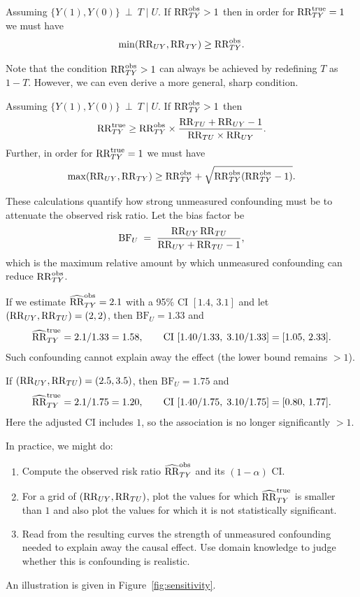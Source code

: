 \documentclass[11pt]{exam}
\begin{document}
\begin{theorem}
    Assuming $\{Y(1),Y(0)\}\ \perp\ T \mid U$. If $\mathrm{RR}^{\mathrm{obs}}_{TY} > 1$ then in order for $\mathrm{RR}^{\mathrm{true}}_{TY} = 1$ we must have 
    \[
        \min(\mathrm{RR}_{UY}, \mathrm{RR}_{TY})  \geq \mathrm{RR}^{\mathrm{obs}}_{TY}.
    \] 
\end{theorem}
Note that the condition $\mathrm{RR}^{\mathrm{obs}}_{TY} > 1$ can always be achieved by redefining $T$ as $1 - T$. However, we can even derive a more general, sharp condition.
\begin{theorem}\label{thm:risk_sensitivity}
    Assuming $\{Y(1),Y(0)\}\ \perp\ T \mid U$. If $\mathrm{RR}^{\mathrm{obs}}_{TY} > 1$ then
    \[
        \mathrm{RR}^{\mathrm{true}}_{TY} \geq \mathrm{RR}^{\mathrm{obs}}_{TY} \times \frac{\mathrm{RR}_{TU} + \mathrm{RR}_{UY} - 1}{\mathrm{RR}_{TU} \times \mathrm{RR}_{UY}}.
    \]
    Further, in order for $\mathrm{RR}^{\mathrm{true}}_{TY} = 1$ we must have
    \[
        \max(\mathrm{RR}_{UY}, \mathrm{RR}_{TY})  \geq \mathrm{RR}^{\mathrm{obs}}_{TY} + \sqrt{\mathrm{RR}^{\mathrm{obs}}_{TY} (\mathrm{RR}^{\mathrm{obs}}_{TY} - 1)}.
    \]
\end{theorem}
These calculations quantify how strong unmeasured confounding must be to attenuate the observed risk ratio. Let the bias factor be
\[
\mathrm{BF}_U \;=\; \frac{\mathrm{RR}_{UY}\,\mathrm{RR}_{TU}}{\mathrm{RR}_{UY}+\mathrm{RR}_{TU}-1},
\]
which is the maximum relative amount by which unmeasured confounding can reduce $\mathrm{RR}^{\mathrm{obs}}_{TY}$.
\begin{example}
    If we estimate $\widehat{\mathrm{RR}}^{\mathrm{obs}}_{TY}=2.1$ with a 95\% CI $[1.4,\,3.1]$ and let $(\mathrm{RR}_{UY},\mathrm{RR}_{TU})=(2,2)$, then $\mathrm{BF}_U=1.33$ and
\[
\widehat{\mathrm{RR}}^{\mathrm{true}}_{TY}=2.1/1.33=1.58,\qquad \text{CI }[1.40/1.33,\;3.10/1.33]=[1.05,\,2.33].
\]
Such confounding cannot explain away the effect (the lower bound remains $>1$).
\end{example}

\begin{example}
    If $(\mathrm{RR}_{UY},\mathrm{RR}_{TU})=(2.5,3.5)$, then $\mathrm{BF}_U=1.75$ and
\[
\widehat{\mathrm{RR}}^{\mathrm{true}}_{TY}=2.1/1.75=1.20,\qquad \text{CI }[1.40/1.75,\;3.10/1.75]=[0.80,\,1.77].
\]
Here the adjusted CI includes $1$, so the association is no longer significantly $>1$.
\end{example} 

In practice, we might do:
\begin{enumerate}
  \item Compute the observed risk ratio $\widehat{\mathrm{RR}}^{\mathrm{obs}}_{TY}$ and its $(1-\alpha)$ CI.
  \item For a grid of $(\mathrm{RR}_{UY},\mathrm{RR}_{TU})$, plot the values for which $\widehat{\mathrm{RR}}^{\mathrm{true}}_{TY}$ is smaller than $1$ and also plot the values for which it is not statistically  significant.
  \item Read from the resulting curves the strength of unmeasured confounding needed to explain away the causal effect. Use domain knowledge to judge whether this is confounding is realistic.
\end{enumerate}
An illustration is given in Figure~\ref{fig:sensitivity}.
\end{document}
